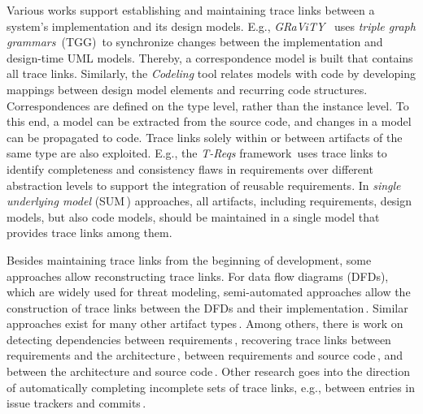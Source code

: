Various works support establishing and maintaining trace links between a system's implementation and its design models.
E.g., %
\emph{GRaViTY}%
\,\cite{PKLS2015,PBKJ2021,Peldszus2022} %
uses
\emph{triple graph grammars}~(TGG)\,\cite{schurr1994specification} to synchronize changes between the implementation and design-time UML models.
Thereby, a correspondence model is built that contains all trace links.
Similarly, the \emph{Codeling} tool \cite{Konersmann2018OEM, Konersmann2018EIA} relates models with code by developing mappings between design model elements and recurring code structures.
Correspondences are defined on the type level, rather than the instance level.
To this end, a model can be extracted from the source code, and changes in a model can be propagated to code.
Trace links solely within or between artifacts of the same type are also exploited.
E.g., the \emph{T-Reqs} framework\,\cite{Grosser2022RDR} uses trace links
to identify completeness and consistency flaws in requirements over different abstraction levels to support the integration of reusable requirements.
In \emph{single underlying model} (SUM\,\cite{Meier2020,Atkinson2010}) approaches, all artifacts, including requirements, design models, but also code models, should be maintained in a single model that provides trace links among them.

Besides maintaining trace links from the beginning of development, some approaches allow reconstructing trace links. %
For data flow diagrams (DFDs), which are widely used for threat modeling, semi-automated approaches allow the construction of trace links between the DFDs and their implementation\,\cite{Peldszus2019SDF,TPS2022}.
Similar approaches exist for many other artifact types\,\cite{Rasiman2022,Merten2016}.
Among others, there is work on detecting dependencies between requirements\,\cite{Samer2019NAI,Wang2020DSS}, recovering trace links between requirements and the architecture\,\cite{Goknil2014,Keim2024},
between requirements and source code\,\cite{10.1145/2491627.2491633,Hey2024}, and between the architecture and source code\,\cite{keim2021trace}.
Other research goes into the direction of automatically completing incomplete sets of trace links, e.g., between entries in issue trackers and commits\,\cite{rath2018}.


